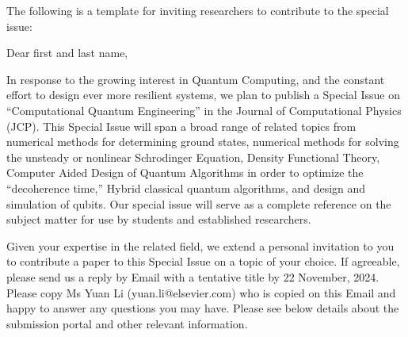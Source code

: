 \documentclass[]{article}
\begin{document}
\begin{comment}

Indicates the timeframe in which the special issue could be produced (to include paper writing, reviewing and submission of final copy to the journal) assuming the proposal is accepted;
Includes a short biography of all authors and guest editors;
Indicates any special timing, associated events, funding support, partnerships or other links or relationships which could influence the development of the issue;
Provides any further information which you feel is relevant.
A special issue normally contains between five and 20 full-length articles, in addition to an editorial written by the special issue organizers. Because it is highly unlikely that all articles submitted for potential inclusion in a special issue will successfully pass the peer review process, it is wise to consider more papers than you anticipate as the upper limit. If fewer than three articles are accepted for publication, the articles will be published as stand-alone articles in the journal.
Once you're ready, use the link below to find your chosen journal and submit your proposal.

https://www.elsevier.com/editor/role/guest/guide

\end{comment}

The following is a template for inviting researchers to contribute to the special issue: \\
\par\noindent
Dear first and last name, \\
\par\noindent

In response to the growing interest in Quantum Computing, and the constant effort to design ever more resilient systems, we plan to publish a Special Issue on ``Computational Quantum Engineering'' in the Journal of Computational Physics (JCP). This Special Issue will span a broad range of related topics from numerical methods for determining ground states, numerical methods for solving the unsteady or nonlinear Schrodinger Equation, Density Functional Theory, Computer Aided Design of Quantum Algorithms in order to optimize the ``decoherence time,'' Hybrid classical quantum algorithms, and design and simulation of qubits. Our special issue will serve as a complete reference on the subject matter for use by students and established researchers. \\

\par\noindent
Given your expertise in the related field, we extend a personal invitation to you to contribute a paper to this Special Issue on a topic of your choice. If agreeable, please send us a reply by Email with a tentative title by 22 November, 2024. Please copy Ms Yuan Li (yuan.li@elsevier.com) who is copied on this Email and happy to answer any questions you may have. Please see below details about the submission portal and other relevant information. \\
\end{document}
